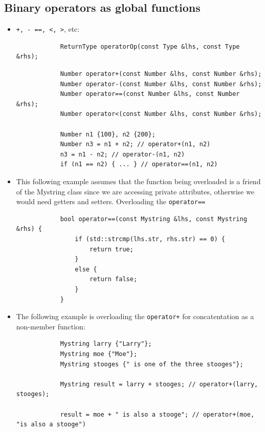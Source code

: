 \subsection{Binary operators as global functions}
\begin{itemize}
    \item \texttt{+, - ==, <, >}, etc:
        \begin{verbatim}
            ReturnType operatorOp(const Type &lhs, const Type &rhs);
        \end{verbatim}
        \begin{verbatim}
            Number operator+(const Number &lhs, const Number &rhs);
            Number operator-(const Number &lhs, const Number &rhs);
            Number operator==(const Number &lhs, const Number &rhs);
            Number operator<(const Number &lhs, const Number &rhs);

            Number n1 {100}, n2 {200};
            Number n3 = n1 + n2; // operator+(n1, n2)
            n3 = n1 - n2; // operator-(n1, n2)
            if (n1 == n2) { ... } // operator==(n1, n2)
        \end{verbatim}
    
    \item This following example assumes that the function being overloaded is a friend of the Mystring class since we are accessing private attributes, otherwise we would need getters and setters. Overloading the \texttt{operator==}
        \begin{verbatim}
            bool operator==(const Mystring &lhs, const Mystring &rhs) {
                if (std::strcmp(lhs.str, rhs.str) == 0) {
                    return true;
                }
                else {
                    return false;
                }
            }
        \end{verbatim}
    
    \item The following example is overloading the \texttt{operator+} for concatentation as a non-member function:
        \begin{verbatim}
            Mystring larry {"Larry"};
            Mystring moe {"Moe"};
            Mystring stooges {" is one of the three stooges"};

            Mystring result = larry + stooges; // operator+(larry, stooges);

            result = moe + " is also a stooge"; // operator+(moe, "is also a stooge")


\end{verbatim}
\end{itemize}
